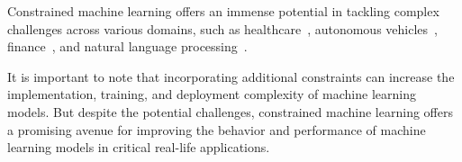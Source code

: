 \documentclass[letterpaper]{article} %
\begin{document}
Constrained machine learning offers an immense potential in tackling complex challenges across various domains, such as healthcare~\cite{ahmad2018interpretable, chen2021ethical, nguyen2021budget}, autonomous vehicles~\cite{gonzalez2015review, dalal2018safe}, finance~\cite{bae2022constrained, al2022optimization}, and natural language processing~\cite{ammanabrolu2020graph, yang2021safe, zhang2022survey}.


It is important to note that incorporating additional constraints can increase the implementation, training, and deployment complexity of machine learning models.
But despite the potential challenges, constrained machine learning offers a promising avenue for improving the behavior and performance of machine learning models in critical real-life applications.
\end{document}
